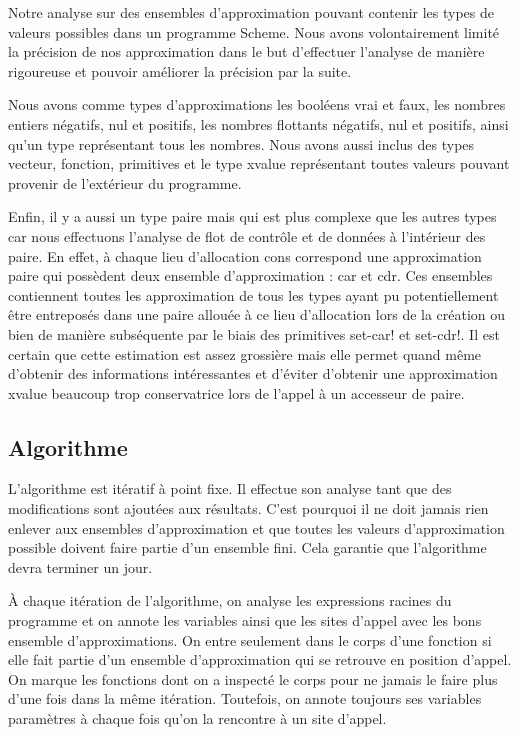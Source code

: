 Notre analyse sur des ensembles d'approximation pouvant contenir les
types de valeurs possibles dans un programme Scheme. Nous avons
volontairement limité la précision de nos approximation dans le but
d'effectuer l'analyse de manière rigoureuse et pouvoir améliorer la
précision par la suite.

Nous avons comme types d'approximations les booléens vrai et faux, les
nombres entiers négatifs, nul et positifs, les nombres flottants
négatifs, nul et positifs, ainsi qu'un type représentant tous les
nombres. Nous avons aussi inclus des types vecteur, fonction,
primitives et le type xvalue représentant toutes valeurs pouvant
provenir de l'extérieur du programme.

Enfin, il y a aussi un type paire mais qui est plus complexe que les
autres types car nous effectuons l'analyse de flot de contrôle et de
données à l'intérieur des paire.  En effet, à chaque lieu d'allocation
cons correspond une approximation paire qui possèdent deux ensemble
d'approximation : car et cdr. Ces ensembles contiennent toutes les
approximation de tous les types ayant pu potentiellement être
entreposés dans une paire allouée à ce lieu d'allocation lors de la
création ou bien de manière subséquente par le biais des primitives
set-car! et set-cdr!. Il est certain que cette estimation est assez
grossière mais elle permet quand même d'obtenir des informations
intéressantes et d'éviter d'obtenir une approximation xvalue beaucoup
trop conservatrice lors de l'appel à un accesseur de paire.

\subsection{Algorithme}

L'algorithme est itératif à point fixe. Il effectue son analyse tant
que des modifications sont ajoutées aux résultats. C'est pourquoi il
ne doit jamais rien enlever aux ensembles d'approximation et que
toutes les valeurs d'approximation possible doivent faire partie d'un
ensemble fini. Cela garantie que l'algorithme devra terminer un jour.

À chaque itération de l'algorithme, on analyse les expressions racines
du programme et on annote les variables ainsi que les sites d'appel
avec les bons ensemble d'approximations. On entre seulement dans le
corps d'une fonction si elle fait partie d'un ensemble d'approximation
qui se retrouve en position d'appel. On marque les fonctions dont on a
inspecté le corps pour ne jamais le faire plus d'une fois dans la même
itération. Toutefois, on annote toujours ses variables paramètres à
chaque fois qu'on la rencontre à un site d'appel.


